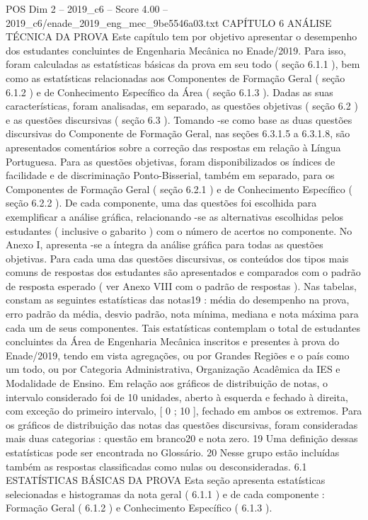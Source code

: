 \begin{textsample}{POS Dim 2 – 2019\_c6 – Score 4.00 – 2019\_c6/enade\_2019\_eng\_mec\_9be5546a03.txt}  \label{ex:f2_pos_153}
CAPÍTULO 6 ANÁLISE TÉCNICA DA PROVA Este capítulo tem por objetivo apresentar o desempenho dos estudantes concluintes de Engenharia Mecânica no Enade/2019.
Para isso, foram calculadas as estatísticas básicas da prova em seu todo ( seção 6.1.1 ), bem como as estatísticas relacionadas aos Componentes de Formação Geral ( seção 6.1.2 ) e de Conhecimento Específico da Área ( seção 6.1.3 ).
Dadas as suas características, foram analisadas, em separado, as questões objetivas ( seção 6.2 ) e as questões discursivas ( seção 6.3 ).
Tomando -se como base as duas questões discursivas do Componente de Formação Geral, nas seções 6.3.1.5 a 6.3.1.8, são apresentados comentários sobre a correção das respostas em relação à Língua Portuguesa.
Para as questões objetivas, foram disponibilizados os índices de facilidade e de discriminação Ponto-Bisserial, também em separado, para os Componentes de Formação Geral ( seção 6.2.1 ) e de Conhecimento Específico ( seção 6.2.2 ).
De cada componente, uma das questões foi escolhida para exemplificar a análise gráfica, relacionando -se as alternativas escolhidas pelos estudantes ( inclusive o gabarito ) com o número de acertos no componente.
No Anexo I, apresenta -se a íntegra da análise gráfica para todas as questões objetivas.
Para cada uma das questões discursivas, os conteúdos dos tipos mais comuns de respostas dos estudantes são apresentados e comparados com o padrão de resposta esperado ( ver Anexo VIII com o padrão de respostas ).
Nas tabelas, constam as seguintes estatísticas das notas19 : média do desempenho na prova, erro padrão da média, desvio padrão, nota mínima, mediana e nota máxima para cada um de seus componentes.
Tais estatísticas contemplam o total de estudantes concluintes da Área de Engenharia Mecânica inscritos e presentes à prova do Enade/2019, tendo em vista agregações, ou por Grandes Regiões e o país como um todo, ou por Categoria Administrativa, Organização Acadêmica da IES e Modalidade de Ensino.
Em relação aos gráficos de distribuição de notas, o intervalo considerado foi de 10 unidades, aberto à esquerda e fechado à direita, com exceção do primeiro intervalo, [ 0 ; 10 ], fechado em ambos os extremos.
Para os gráficos de distribuição das notas das questões discursivas, foram consideradas mais duas categorias : questão em branco20 e nota zero. 19 Uma definição dessas estatísticas pode ser encontrada no Glossário. 20 Nesse grupo estão incluídas também as respostas classificadas como nulas ou desconsideradas. 6.1 ESTATÍSTICAS BÁSICAS DA PROVA Esta seção apresenta estatísticas selecionadas e histogramas da nota geral ( 6.1.1 ) e de cada componente : Formação Geral ( 6.1.2 ) e Conhecimento Específico ( 6.1.3 ).

\end{textsample}
